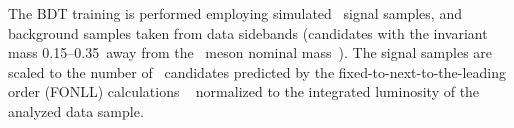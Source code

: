 %
The BDT training is performed employing simulated \PB\ signal samples, and background samples taken from data sidebands (candidates with the invariant mass 0.15--0.35\GeVcc\ away from the \PB\ meson nominal mass~\cite{pdg2018}). %
The signal samples are scaled to the number of \PB\ candidates predicted by the fixed-to-next-to-the-leading order (FONLL) calculations ~\cite{FONLLcharmbottomPP1, FONLLcharmbottomPP2, FONLLcharmbottomPP3} normalized to the integrated luminosity of the analyzed data sample.


%


